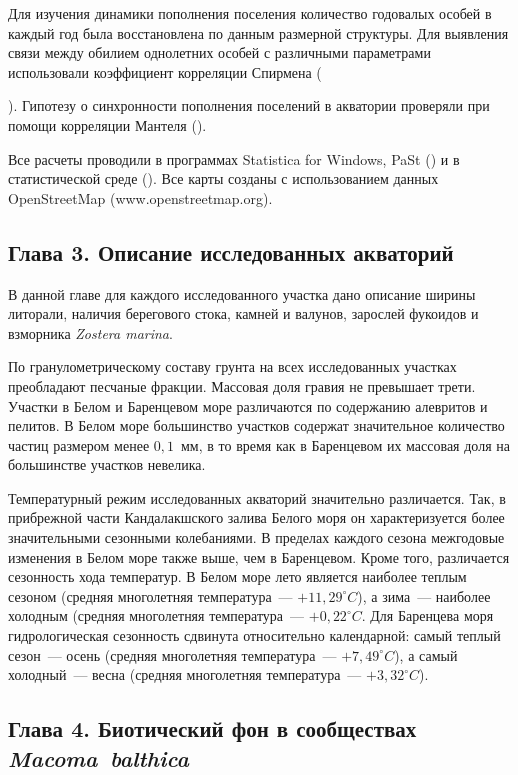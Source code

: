 Для изучения динамики пополнения поселения количество годовалых особей в каждый год была восстановлена по данным размерной структуры.
Для выявления связи между обилием однолетних особей с различными параметрами использовали коэффициент корреляции Спирмена ({\cite{Hollander_et_al_2013}).
Гипотезу о синхронности пополнения поселений в акватории проверяли при помощи корреляции Мантеля (\cite{Legendre_Legendre_2012}).

Все расчеты проводили в программах Statistica for Windows,  PaSt (\cite{Hammer_et_al_2001}) и в статистической среде \R{} (\cite{R_2014}). 
Все карты созданы с использованием данных OpenStreetMap (www.openstreetmap.org).

\subsection*{Глава 3. Описание исследованных акваторий}
В данной главе для каждого исследованного участка дано описание ширины литорали, наличия берегового стока, камней и валунов, зарослей фукоидов и взморника \textit{Zostera marina}.

По гранулометрическому составу грунта на всех исследованных участках преобладают песчаные фракции.
Массовая доля гравия не превышает трети.
Участки в Белом и Баренцевом море различаются по содержанию алевритов и пелитов. 
В Белом море большинство участков содержат значительное количество частиц размером менее $0,1$~мм, в то время как в Баренцевом их массовая доля на большинстве участков невелика.

Температурный режим исследованных акваторий значительно различается.
Так, в прибрежной части Кандалакшского залива Белого моря он характеризуется более значительными сезонными колебаниями.
В пределах каждого сезона межгодовые изменения в Белом море также выше, чем в Баренцевом.
Кроме того, различается сезонность хода температур. 
В Белом море лето является наиболее теплым сезоном (средняя многолетняя температура~--- $+11,29^{\circ}C$), а зима~--- наиболее холодным (средняя многолетняя температура~--- $+0,22^{\circ}C$.
Для Баренцева моря гидрологическая сезонность сдвинута относительно календарной: самый теплый сезон~--- осень (средняя многолетняя температура~--- $+7,49^{\circ}C$), а самый холодный~--- весна (средняя многолетняя температура~--- $+3,32^{\circ}C$).



\subsection*{Глава 4. Биотический фон в сообществах \textit{Macoma~balthica}}

}
